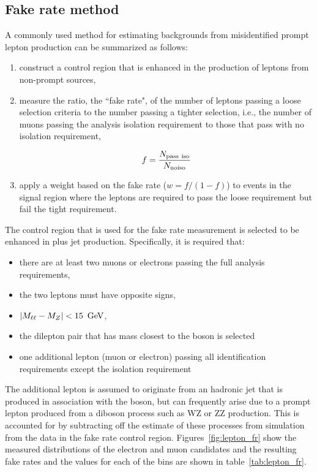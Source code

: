 \subsection{Fake rate method}

A commonly used method for estimating backgrounds from misidentified prompt lepton production can be summarized as follows:

\begin{enumerate}
    \item construct a control region that is enhanced in the production of leptons from non-prompt sources,
    
    \item measure the ratio, the ``fake rate", of the number of leptons passing a loose selection criteria to the number passing a tighter selection, i.e., the number of muons passing the analysis isolation requirement to those that pass with no isolation requirement,
    
        \begin{equation}
            f = \frac{N_{\rm pass\ iso}}{N_{\rm no iso}}
        \end{equation}

    \item apply a weight based on the fake rate ($w = f/(1-f)$) to events in the signal region where the leptons are required to pass the loose requirement but fail the tight requirement.
\end{enumerate}

The control region that is used for the fake rate measurement is selected to be enhanced in \PZ plus jet production.  Specifically, it is required that:

\begin{itemize}
    \item there are at least two muons or electrons passing the full analysis requirements,
    \item the two leptons must have opposite signs,
    \item $|M_{\ell\ell} - M_{Z}| < 15~\,\text{Ge\hspace{-.08em}V}$,
    \item the dilepton pair that has mass closest to the \PZ boson is selected
    \item one additional lepton (muon or electron) passing all
    identification requirements except the isolation requirement
\end{itemize}

The additional lepton is assumed to originate from an hadronic jet that is produced in association with the \PZ boson, but can frequently arise due to a prompt lepton produced from a diboson process such as WZ or ZZ production.  This is accounted for by subtracting off the estimate of these processes from simulation from the data in the fake rate control region.  Figures~\ref{fig:lepton_fr} show the measured \pt distributions of the electron and muon candidates and the resulting fake rates and the values for each of the \pt bins are shown in table~\ref{tab:lepton_fr}.



